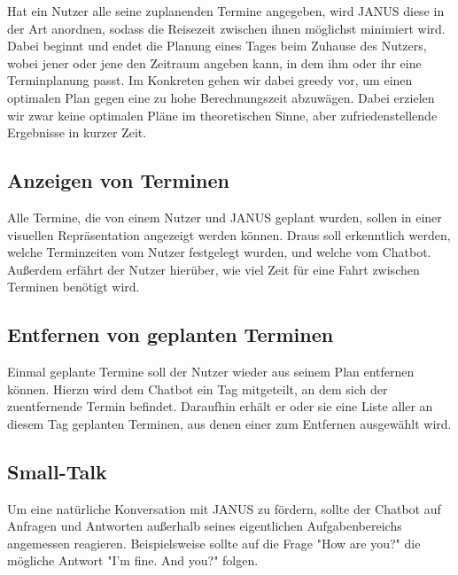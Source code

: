 Hat ein Nutzer alle seine zuplanenden Termine angegeben, wird JANUS diese in der Art anordnen, sodass die Reisezeit zwischen ihnen möglichst minimiert wird. Dabei beginnt und endet die Planung eines Tages beim Zuhause des Nutzers, wobei jener oder jene den Zeitraum angeben kann, in dem ihm oder ihr eine Terminplanung passt. Im Konkreten gehen wir dabei greedy vor, um einen optimalen Plan gegen eine zu hohe Berechnungszeit abzuwägen. Dabei erzielen wir zwar keine optimalen Pläne im theoretischen Sinne, aber zufriedenstellende Ergebnisse in kurzer Zeit.

\subsection{Anzeigen von Terminen}
Alle Termine, die von einem Nutzer und JANUS geplant wurden, sollen in einer visuellen Repräsentation angezeigt werden können. Draus soll erkenntlich werden, welche Terminzeiten vom Nutzer festgelegt wurden, und welche vom Chatbot. Außerdem erfährt der Nutzer hierüber, wie viel Zeit für eine Fahrt zwischen Terminen benötigt wird.

\subsection{Entfernen von geplanten Terminen}
Einmal geplante Termine soll der Nutzer wieder aus seinem Plan entfernen können. Hierzu wird dem Chatbot ein Tag mitgeteilt, an dem sich der zuentfernende Termin befindet. Daraufhin erhält er oder sie eine Liste aller an diesem Tag geplanten Terminen, aus denen einer zum Entfernen ausgewählt wird.

\subsection{Small-Talk}
Um eine natürliche Konversation mit JANUS zu fördern, sollte der Chatbot auf Anfragen und Antworten außerhalb seines eigentlichen Aufgabenbereichs angemessen reagieren. Beispielsweise sollte auf die Frage "How are you?" die mögliche Antwort "I'm fine. And you?" folgen. 
